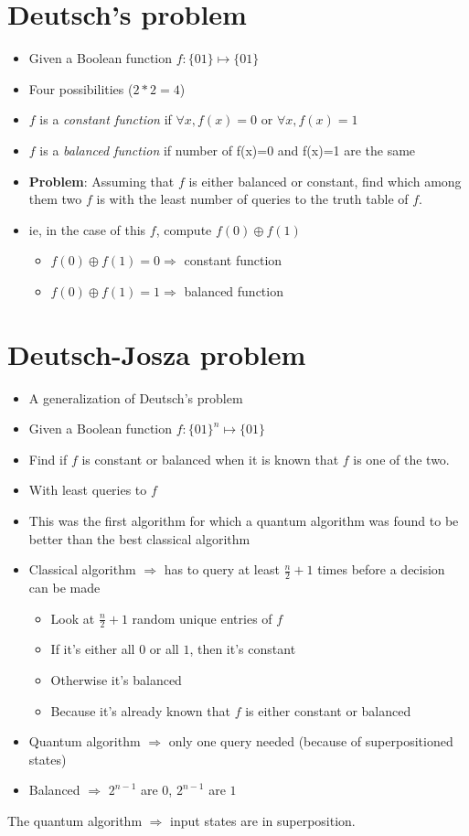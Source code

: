 \documentclass[12pt]{article}
\begin{document}
\section{Deutsch's problem}
\begin{itemize}
\item Given a Boolean function $f: \{01\} \mapsto \{01\}$
\item Four possibilities ($2*2 = 4$)
\item $f$ is a \emph{constant function} if $\forall x, f(x)=0$ or $\forall x, f(x)=1$
\item $f$ is a \emph{balanced function} if number of f(x)=0 and f(x)=1 are
  the same
\item 
\textbf{Problem}:
Assuming that $f$ is either balanced or constant, find which among
them two $f$ is with the least number of queries to the truth table of
$f$.
\item ie, in the case of this $f$, compute $f(0) \oplus f(1)$
  \begin{itemize}
  \item $f(0) \oplus f(1) = 0 \Rightarrow$ constant function
  \item $f(0) \oplus f(1) = 1 \Rightarrow$ balanced function
  \end{itemize}
\end{itemize}


\section{Deutsch-Josza problem}
\begin{itemize}
\item A generalization of Deutsch's problem
\item Given a Boolean function $f: \{01\}^n \mapsto \{01\}$
\item Find if $f$ is constant or balanced when it is known that $f$ is
  one of the two.
\item With least queries to $f$
\item This was the first algorithm for which a quantum algorithm was
  found to be better than the best classical algorithm
\item Classical algorithm $\Rightarrow$ has to query at least
  $\frac{n}{2}+1$ times before a decision can be made
  \begin{itemize}
  \item Look at $\frac{n}{2}+1$ random unique entries of $f$
  \item If it's either all $0$ or all $1$, then it's constant
  \item Otherwise it's balanced
  \item Because it's already known that $f$ is either constant or balanced
  \end{itemize}
\item Quantum algorithm $\Rightarrow$ only one query needed (because
  of superpositioned states)
\item Balanced $\Rightarrow$ $2^{n-1}$ are $0$, $2^{n-1}$ are $1$
\end{itemize}

The quantum algorithm $\Rightarrow$ input states are in superposition.
\end{document}
